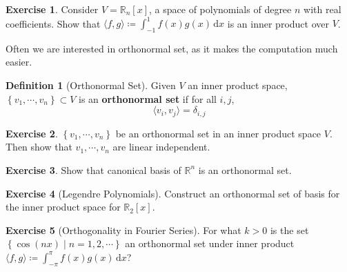 \documentclass[12pt, a4paper]{article}
\newcommand{\R}{\mathbb{R}}
\newcommand{\inner}[1]{\langle #1 \rangle}
\newcommand{\intd}{\,\text{d}}
\theoremstyle{remark}
\theoremstyle{definition}
\newtheorem{definition}{Definition}
\newtheorem{exercise}{Exercise}
\numberwithin{equation}{section}
\numberwithin{definition}{section}
\numberwithin{example}{section}
\numberwithin{exercise}{section}
\numberwithin{remark}{section}
\numberwithin{figure}{section}
\begin{document}
\begin{exercise}
    \label{ex: Polynomial Inner Product}
    Consider $V = \R_n \left[ x \right]$, a space of polynomials of degree $n$ with real coefficients.
    Show that $\inner{f, g} \coloneqq \int_{-1}^1 f(x) g(x) \intd x$ is an inner product over $V$.
\end{exercise}
Often we are interested in orthonormal set, as it makes the computation much easier.
\begin{definition}[Orthonormal Set]
    Given $V$ an inner product space, $\left\{ v_1, \cdots, v_n \right\} \subset V$ is an \textbf{orthonormal set}
    if for all $i,j$,
    \begin{equation*}
        \inner{v_i, v_j} = \delta_{i,j}
    \end{equation*}
\end{definition}
\begin{exercise}
    $\left\{ v_1, \cdots, v_n \right\}$ be an orthonormal set in an inner product space $V$.
    Then show that $v_1, \cdots, v_n$ are linear independent.
\end{exercise}
\begin{exercise}
    Show that canonical basis of $\R^n$ is an orthonormal set.
\end{exercise}
\begin{exercise}[Legendre Polynomials]
    Construct an orthonormal set of basis for the inner product space for $\mathbb{R}_2 \left[ x \right]$.
\end{exercise}
\begin{exercise}[Orthogonality in Fourier Series]
    For what $k>0$ is the set $\left\{ \cos{(nx)} \middle| n = 1, 2, \cdots \right\}$ an orthonormal set
    under inner product $\inner{f,g} \coloneqq \int_{-\pi}^\pi f(x) g(x) \intd x$?
\end{exercise}
\end{document}
